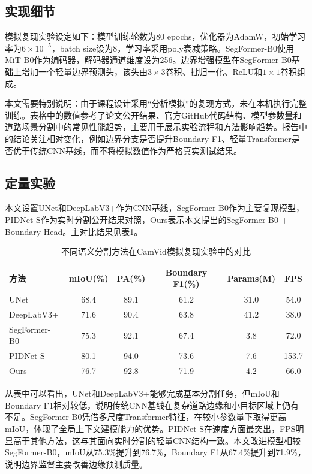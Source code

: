 \documentclass{report}
\begin{document}
\subsection{实现细节}

模拟复现实验设定如下：模型训练轮数为80 epochs，优化器为AdamW，初始学习率为$6\times10^{-5}$，batch size设为8，学习率采用poly衰减策略。SegFormer-B0使用MiT-B0作为编码器，解码器通道维度设为256。边界增强模型在SegFormer-B0基础上增加一个轻量边界预测头，该头由$3\times3$卷积、批归一化、ReLU和$1\times1$卷积组成。

本文需要特别说明：由于课程设计采用“分析模拟”的复现方式，未在本机执行完整训练。表格中的数值参考了论文公开结果、官方GitHub代码结构、模型参数量和道路场景分割中的常见性能趋势，主要用于展示实验流程和方法影响趋势。报告中的结论关注相对变化，例如边界分支是否提升Boundary F1、轻量Transformer是否优于传统CNN基线，而不将模拟数值作为严格真实测试结果。

\subsection{定量实验}

本文设置UNet和DeepLabV3+作为CNN基线，SegFormer-B0作为主要复现模型，PIDNet-S作为实时分割公开结果对照，Ours表示本文提出的SegFormer-B0 + Boundary Head。主对比结果见表\ref{tab:main_compare}。

\begin{table}[H]
\centering
\caption{不同语义分割方法在CamVid模拟复现实验中的对比}
\label{tab:main_compare}
\begin{tabular}{lccccc}
\toprule
方法 & mIoU(\%) & PA(\%) & Boundary F1(\%) & Params(M) & FPS \\
\midrule
UNet & 68.4 & 89.1 & 61.2 & 31.0 & 54.0 \\
DeepLabV3+ & 71.6 & 90.4 & 63.8 & 41.2 & 38.0 \\
SegFormer-B0 & 75.3 & 92.1 & 67.4 & 3.8 & 72.0 \\
PIDNet-S & 80.1 & 94.0 & 73.6 & 7.6 & 153.7 \\
Ours & 76.7 & 92.8 & 71.9 & 4.2 & 66.0 \\
\bottomrule
\end{tabular}
\end{table}

从表中可以看出，UNet和DeepLabV3+能够完成基本分割任务，但mIoU和Boundary F1相对较低，说明传统CNN基线在复杂道路边缘和小目标区域上仍有不足。SegFormer-B0凭借多尺度Transformer特征，在较小参数量下取得更高mIoU，体现了全局上下文建模能力的优势。PIDNet-S在速度方面最突出，FPS明显高于其他方法，这与其面向实时分割的轻量CNN结构一致。本文改进模型相较SegFormer-B0，mIoU从75.3\%提升到76.7\%，Boundary F1从67.4\%提升到71.9\%，说明边界监督主要改善边缘预测质量。
\end{document}
